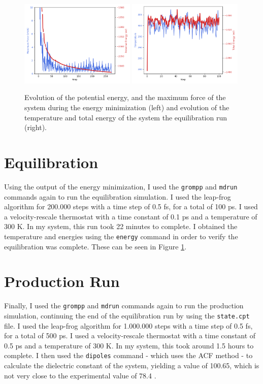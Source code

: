 \documentclass[a4paper,11pt]{article}
\begin{document}
\begin{figure}[ht]
    \centering
    \includegraphics[width=0.49\textwidth]{../figures/emin.png} \includegraphics[width=0.49\textwidth]{../figures/equi.png}
    \caption{Evolution of the potential energy, and the maximum force of the system during the energy minimization (left) and evolution of the temperature and total energy of the system the equilibration run (right).}
    \label{fig:emin-equi}
\end{figure}

\section{Equilibration}

Using the output of the energy minimization, I used the \texttt{grompp} and \texttt{mdrun} commands again to run the equilibration simulation. I used the leap-frog algorithm for 200.000 steps with a time step of 0.5 fs, for a total of 100 ps. I used a velocity-rescale thermostat with a time constant of 0.1 ps and a temperature of 300 K. In my system, this run took 22 minutes to complete. I obtained the temperature and energies using the \texttt{energy} command in order to verify the equilibration was complete. These can be seen in Figure \ref{fig:emin-equi}.

\section{Production Run}

Finally, I used the \texttt{grompp} and \texttt{mdrun} commands again to run the production simulation, continuing the end of the equilibration run by using the \texttt{state.cpt} file. I used the leap-frog algorithm for 1.000.000 steps with a time step of 0.5 fs, for a total of 500 ps. I used a velocity-rescale thermostat with a time constant of 0.5 ps and a temperature of 300 K. In my system, this took around 1.5 hours to complete. I then used the \texttt{dipoles} command - which uses the ACF method - to calculate the dielectric constant of the system, yielding a value of 100.65, which is not very close to the experimental value of 78.4 \cite{dielectric}.
\end{document}
